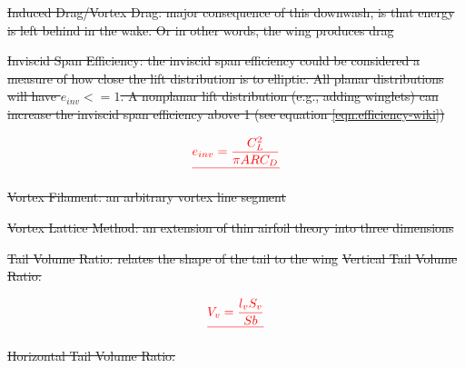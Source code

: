 \documentclass[journal]{new-aiaa} %
\providecommand{\DIFdel}[1]{{\protect\color{red}\sout{#1}}}                      %
\providecommand{\DIFdelbegin}{} %
\providecommand{\DIFdelend}{} %
\newcommand{\DIFscaledelfig}{0.5}
\newlength{\DIFdelgraphicswidth} %
\newlength{\DIFdelgraphicsheight} %
\newcommand{\DIFdelincludegraphics}[2][]{%
\sbox{\DIFdelgraphicsbox}{\DIFOincludegraphics[#1]{#2}}%
\settoboxwidth{\DIFdelgraphicswidth}{\DIFdelgraphicsbox} %
\settoboxtotalheight{\DIFdelgraphicsheight}{\DIFdelgraphicsbox} %
\scalebox{\DIFscaledelfig}{%
\parbox[b]{\DIFdelgraphicswidth}{\usebox{\DIFdelgraphicsbox}\\[-\baselineskip] \rule{\DIFdelgraphicswidth}{0em}}\llap{\resizebox{\DIFdelgraphicswidth}{\DIFdelgraphicsheight}{%
\setlength{\unitlength}{\DIFdelgraphicswidth}%
\begin{picture}(1,1)%
\thicklines\linethickness{2pt} %
{\color[rgb]{1,0,0}\put(0,0){\framebox(1,1){}}}%
{\color[rgb]{1,0,0}\put(0,0){\line( 1,1){1}}}%
{\color[rgb]{1,0,0}\put(0,1){\line(1,-1){1}}}%
\end{picture}%
}\hspace*{3pt}}} %
} %
\DeclareRobustCommand{\DIFdelbegin}{\DIFOdelbegin \let\includegraphics\DIFdelincludegraphics} %
\DeclareRobustCommand{\DIFdelend}{\DIFOaddend \let\includegraphics\DIFOincludegraphics} %
\begin{document}
	
	
	
	
	\DIFdelbegin %
\item%
\DIFdel{Induced Drag/Vortex Drag: major consequence of this downwash, is that energy is left behind in the wake. Or in other words, the wing produces drag
		}%
\item%
\DIFdel{Inviscid Span Efficiency:  the inviscid span efficiency could be considered a measure of how close the lift distribution is to elliptic. All planar distributions will have \(e_{inv} <= 1\). A nonplanar lift distribution (e.g., adding winglets) can increase the inviscid span efficiency above 1 (see equation \ref{eqn:efficiency-wiki})
		}\DIFdelend %

	\DIFdelbegin \begin{displaymath}
			\DIFdel{e_{inv} = \frac{C_L^2}{\pi{ARC_D}}
		}\end{displaymath}%

\item%
\DIFdel{Vortex Filament: an arbitrary vortex line segment
		}%
\item%
\DIFdel{Vortex Lattice Method: an extension of thin airfoil theory into three dimensions
		}%
\item%
\DIFdel{Tail Volume Ratio: relates the shape of the tail to the wing }%
\DIFdel{Vertical Tail Volume Ratio: 
		}%

\begin{displaymath}
			\DIFdel{V_v = \frac{l_vS_v}{Sb}
		}\end{displaymath}%

\DIFdel{Horizontal Tail Volume Ratio:
		}%
\end{document}
